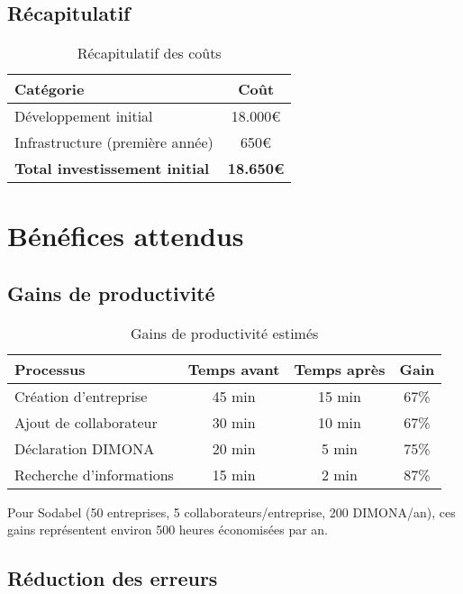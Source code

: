 \subsection{Récapitulatif}

\begin{table}[h]
\centering
\begin{tabular}{|l|c|}
\hline
\textbf{Catégorie} & \textbf{Coût} \\
\hline
Développement initial & 18.000€ \\
Infrastructure (première année) & 650€ \\
\hline
\textbf{Total investissement initial} & \textbf{18.650€} \\
\hline
\end{tabular}
\caption{Récapitulatif des coûts}
\end{table}

\section{Bénéfices attendus}

\subsection{Gains de productivité}

\begin{table}[h]
\centering
\begin{tabular}{|l|c|c|c|}
\hline
\textbf{Processus} & \textbf{Temps avant} & \textbf{Temps après} & \textbf{Gain} \\
\hline
Création d'entreprise & 45 min & 15 min & 67\% \\
Ajout de collaborateur & 30 min & 10 min & 67\% \\
Déclaration DIMONA & 20 min & 5 min & 75\% \\
Recherche d'informations & 15 min & 2 min & 87\% \\
\hline
\end{tabular}
\caption{Gains de productivité estimés}
\end{table}

Pour Sodabel (50 entreprises, 5 collaborateurs/entreprise, 200 DIMONA/an), ces gains représentent environ 500 heures économisées par an.

\subsection{Réduction des erreurs}

